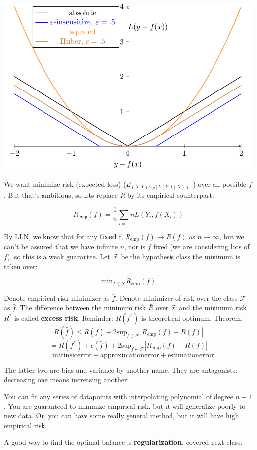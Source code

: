 \documentclass{article}
\begin{document}
\begin{centering}
\includegraphics[scale=0.35]{graph2}
\end{centering}

We want minimize risk (expected loss) ($E_{(X,Y)\sim_P[L(Y, f(X))]}$) over all
possible $f$. But that's ambitious, so lets replace $R$ by its empirical
counterpart:

$$
R_{\mathrm{emp}} (f) = \frac{1}{n} \sum_{i=1}{n} L(Y_i, f(X_i))
$$

By LLN, we know that for any \textbf{fixed} f, $R_{\mathrm{emp}}(f) \to R(f)$ as
$n \to \infty$, but we can't be assured that we have infinite $n$, nor is $f$
fixed (we are considering lots of $f$), so this is a weak guarantee. Let $\mathcal{F}$ be the hypothesis class the minimum is taken over:

$$
\mathrm{min}_{f \in \mathcal{F}} R_{\mathrm{emp}}(f)
$$

Denote empirical risk minimizer as $\hat{f}$. Denote minimizer of risk over the
class $\mathcal{F}$ as $\bar{f}$. The difference between the minimum risk $\bar{R}$ over $\mathcal{F}$ and the
minimum risk $R^*$ is called \textbf{excess risk}. Reminder: $R(f^*)$ is
theoretical optimum. Theorem:
$$R(\hat{f}) \leq R(\bar{f}) + 2 \mathrm{sup}_{f \in
\mathcal{F}}|R_\mathrm{emp}(f)-R(f)|$$
$$= R(f^*) + \epsilon(\bar{f}) + 2 \mathrm{sup}_{f \in
\mathcal{F}}|R_\mathrm{emp}(f)-R(f)|$$
$$
= \mathrm{intrinsic error} + \mathrm{approximation error} + \mathrm{estimation
error}
$$

The latter two are bias and variance by another name. They are antagonists:
decreasing one means increasing another. 

\smallskip

You can fit any series of datapoints with interpolating polynomial of degree
$n-1$. You are guaranteed to minimize empirical risk, but it will generalize
poorly to new data. Or, you can have some really general method, but it will
have high empirical risk.

\smallskip

A good way to find the optimal balance is \textbf{regularization}, covered next
class.
\end{document}
